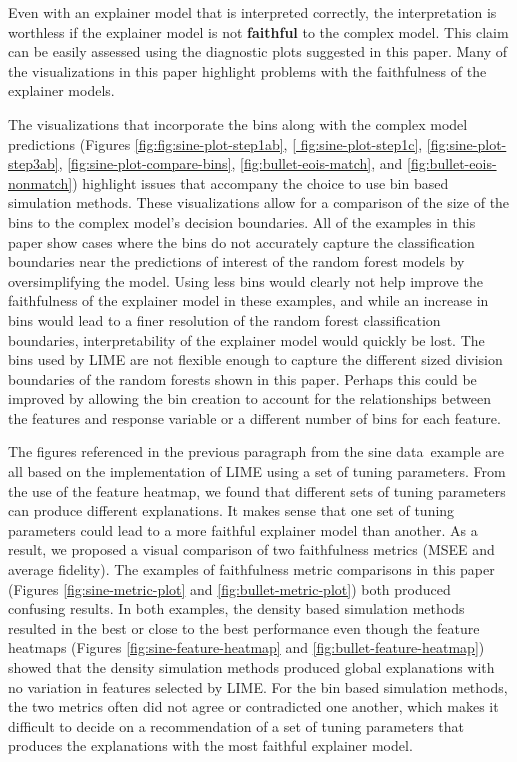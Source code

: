 \documentclass[AMS,STIX2COL]{WileyNJD-v2}\usepackage[]{graphicx}\usepackage[]{color}
\newcommand{\data}{sine data}
\begin{document}
{Even with an explainer model that is interpreted correctly, the interpretation is worthless if the explainer model is not \textbf{faithful} to the complex model. This claim can be easily assessed using the diagnostic plots suggested in this paper. Many of the visualizations in this paper highlight problems with the faithfulness of the explainer models.

The visualizations that incorporate the bins along with the complex model predictions (Figures \ref{fig:fig:sine-plot-step1ab}, \ref{ fig:sine-plot-step1c}, \ref{fig:sine-plot-step3ab}, \ref{fig:sine-plot-compare-bins}, \ref{fig:bullet-eois-match}, and \ref{fig:bullet-eois-nonmatch}) highlight issues that accompany the choice to use bin based simulation methods. These visualizations allow for a comparison of the size of the bins to the complex model's decision boundaries. All of the examples in this paper show cases where the bins do not accurately capture the classification boundaries near the predictions of interest of the random forest models by oversimplifying the model. Using less bins would clearly not help improve the faithfulness of the explainer model in these examples, and while an increase in bins would lead to a finer resolution of the random forest classification boundaries, interpretability of the explainer model would quickly be lost. The bins used by LIME are not flexible enough to capture the different sized division boundaries of the random forests shown in this paper. Perhaps this could be improved by allowing the bin creation to account for the relationships between the features and response variable or a different number of bins for each feature.

The figures referenced in the previous paragraph from the \data \ example are all based on the implementation of LIME using a set of tuning parameters. From the use of the feature heatmap, we found that different sets of tuning parameters can produce different explanations. It makes sense that one set of tuning parameters could lead to a more faithful explainer model than another. As a result, we proposed a visual comparison of two faithfulness metrics (MSEE and average fidelity). The examples of faithfulness metric comparisons in this paper (Figures \ref{fig:sine-metric-plot} and \ref{fig:bullet-metric-plot}) both produced confusing results. In both examples, the density based simulation methods resulted in the best or close to the best performance even though the feature heatmaps (Figures \ref{fig:sine-feature-heatmap} and \ref{fig:bullet-feature-heatmap}) showed that the density simulation methods produced global explanations with no variation in features selected by LIME. For the bin based simulation methods, the two metrics often did not agree or contradicted one another, which makes it difficult to decide on a recommendation of a set of tuning parameters that produces the explanations with the most faithful explainer model.

}
\end{document}
